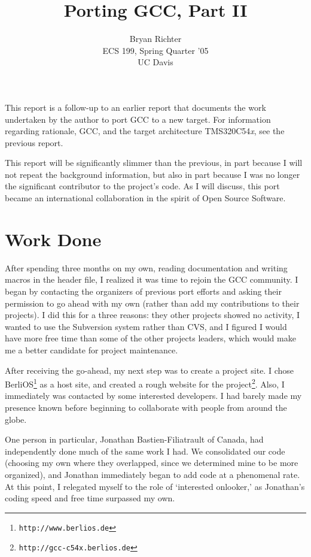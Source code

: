 \documentclass{article}
\author{Bryan Richter\\ECS 199, Spring Quarter '05\\UC Davis}
\title{Porting GCC, Part II}
\begin{document}
\maketitle

This report is a follow-up to an earlier report that documents the work
undertaken by the author to port GCC to a new target. For information regarding
rationale, GCC, and the target architecture TMS320C54\emph{x}, see the previous
report.

This report will be significantly slimmer than the previous, in part because I
will not repeat the background information, but also in part because I was no
longer the significant contributor to the project's code. As I will discuss,
this port became an international collaboration in the spirit of Open Source
Software.

\section{Work Done}

After spending three months on my own, reading documentation and writing macros
in the header file, I realized it was time to rejoin the GCC community. I began
by contacting the organizers of previous port efforts and asking their
permission to go ahead with my own (rather than add my contributions to their
projects). I did this for a three reasons: they other projects showed no
activity, I wanted to use the Subversion system rather than CVS, and I figured I
would have more free time than some of the other projects leaders, which would
make me a better candidate for project maintenance.

After receiving the go-ahead, my next step was to create a project site. I chose
BerliOS\footnote{\tt http://www.berlios.de} as a host site, and created a rough
website for the project\footnote{\tt http://gcc-c54x.berlios.de}. Also, I
immediately was contacted by some interested developers. I had barely made my
presence known before beginning to collaborate with people from around the globe.

One person in particular, Jonathan Bastien-Filiatrault of Canada, had
independently done much of the same work I had. We consolidated our code
(choosing my own where they overlapped, since we determined mine to be more
organized), and Jonathan immediately began to add code at a phenomenal rate. At
this point, I relegated myself to the role of `interested onlooker,' as
Jonathan's coding speed and free time surpassed my own.
\end{document}
